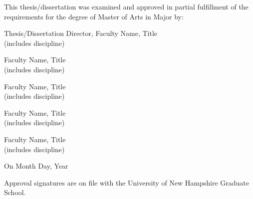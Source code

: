\thispagestyle{empty}

\vspace*{1in}

\noindent
{\small This thesis/dissertation was examined and approved in partial fulfillment of the requirements for the degree of Master of Arts in Major by:}
\vspace{0.25in}

\begin{flushright}
\begin{minipage}{4.5in}
\begin{flushleft}
{\small Thesis/Dissertation Director, Faculty Name, Title\\
(includes discipline)}
\vspace{0.1in}

{\small Faculty Name, Title\\
(includes discipline)}
\vspace{0.1in}

{\small Faculty Name, Title\\
(includes discipline)}
\vspace{0.1in}

{\small Faculty Name, Title\\
(includes discipline)}
\vspace{0.1in}

{\small Faculty Name, Title\\
(includes discipline)}
\vspace{0.25in}

{\small On Month Day, Year}
\end{flushleft}
\end{minipage}
\end{flushright}
\vspace{0.25in}

{\small Approval signatures are on file with the University of New Hampshire Graduate School.}

\vspace*{\fill} 